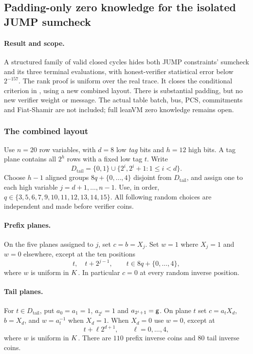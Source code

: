 \subsection{Padding-only zero knowledge for the isolated JUMP sumcheck}\label{note:zk-jump-rank}

\paragraph{Result and scope.} A structured family of valid closed cycles hides both JUMP constraints' sumcheck and its three terminal evaluations, with honest-verifier statistical error below $2^{-157}$. The rank proof is uniform over the real trace. It closes the conditional criterion in , using a new combined layout. There is substantial padding, but no new verifier weight or message. The actual table batch, bus, PCS, commitments and Fiat-Shamir are not included; full leanVM zero knowledge remains open.

\subsubsection{The combined layout}

Use $n=20$ row variables, with $d=8$ low \emph{tag} bits and $h=12$ high bits. A tag plane contains all $2^h$ rows with a fixed low tag $t$. Write
\[
 D_{\mathrm{tail}}=\{0,1\}\cup\{2^i,2^i+1:1\le i<d\}.
\]
Choose $h-1$ aligned groups $8q+\{0,\ldots,4\}$ disjoint from $D_{\mathrm{tail}}$, and assign one to each high variable $j=d+1,\ldots,n-1$. Use, in order, $q\in\{3,5,6,7,9,10,11,12,13,14,15\}$. All following random choices are independent and made before verifier coins.

\paragraph{Prefix planes.} On the five planes assigned to $j$, set $c=b=X_j$. Set $w=1$ where $X_j=1$ and $w=0$ elsewhere, except at the ten positions
\[
 t,\quad t+2^{j-1},\qquad t\in8q+\{0,\ldots,4\},
\]
where $w$ is uniform in $K$. In particular $c=0$ at every random inverse position.

\paragraph{Tail planes.} For $t\in D_{\mathrm{tail}}$, put $a_0=a_1=1$, $a_{2^i}=1$ and $a_{2^i+1}=\mathsf{g}$. On plane $t$ set $c=a_tX_d$, $b=X_d$, and $w=a_t^{-1}$ when $X_d=1$. When $X_d=0$ use $w=0$, except at
\[
 t+\ell 2^{d+1},\qquad \ell=0,\ldots,4,
\]
where $w$ is uniform in $K$. There are $110$ prefix inverse coins and $80$ tail inverse coins.


